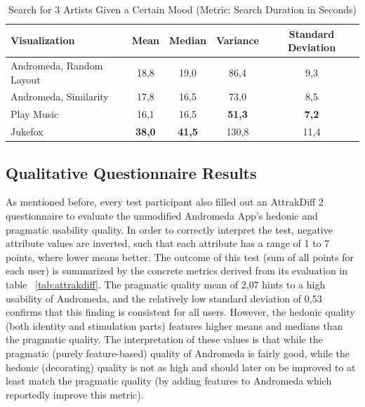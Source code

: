 \begin{table}[H]
\begin{center}
\begin{tabular}{ | l | c | c | c | c |}
	\hline
	\textbf{Visualization} & \textbf{Mean} & \textbf{Median} & \textbf{Variance} & \textbf{Standard Deviation}\\ \hline
	Andromeda, Random Layout & 18,8 & 19,0 & 86,4 & 9,3 \\ \hline
	Andromeda, Similarity & 17,8 & 16,5 & 73,0 & 8,5 \\ \hline
	Play Music & 16,1 & 16,5 & \textbf{51,3} & \textbf{7,2} \\ \hline
	Jukefox & \textbf{38,0} & \textbf{41,5} & 130,8 & 11,4 \\ \hline
\end{tabular}
\caption {Search for 3 Artists Given a Certain Mood (Metric: Search Duration in Seconds)} \label{tab:search-mood} 
\end{center}
\end{table}


\subsection{Qualitative Questionnaire Results}
\label{sec:qualitative-questionnaire-results}

As mentioned before, every test participant also filled out an AttrakDiff 2 questionnaire to evaluate the unmodified Andromeda App's hedonic and pragmatic usability quality. In order to correctly interpret the test, negative attribute values are inverted, such that each attribute has a range of 1 to 7 points, where lower means better. The outcome of this test (sum of all points for each user) is  summarized by the concrete metrics derived from its evaluation in table ~\ref{tab:attrakdiff}. The pragmatic quality mean of 2,07 hints to a high usability of Andromeda, and the relatively low standard deviation of 0,53 confirms that this finding is consistent for all users. However, the hedonic quality (both identity and stimulation parts) features higher means and medians than the pragmatic quality. The interpretation of these values is that while the pragmatic (purely feature-based) quality of Andromeda is fairly good, while the hedonic (decorating) quality is not as high and should later on be improved to at least match the pragmatic quality (by adding features to Andromeda which reportedly improve this metric).

